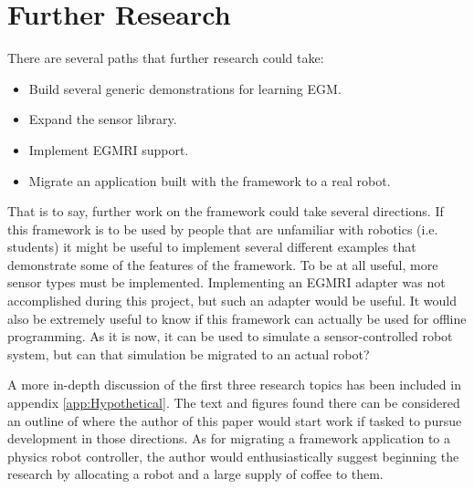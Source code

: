 \documentclass{cslthse-msc}
\begin{document}
\section{Further Research}
\label{sec:Anal_Con:Fur_Res}
There are several paths that further research could take:
\begin{itemize}
    \item Build several generic demonstrations for learning EGM.
    \item Expand the sensor library.
    \item Implement EGMRI support.
    \item Migrate an application built with the framework to a real robot. 
\end{itemize}
That is to say, further work on the framework could take several directions. If this framework is to be used by people that are unfamiliar with robotics (i.e. students) it might be useful to implement several different examples that demonstrate some of the features of the framework. To be at all useful, more sensor types must be implemented. Implementing an EGMRI adapter was not accomplished during this project, but such an adapter would be useful. It would also be extremely useful to know if this framework can actually be used for offline programming. As it is now, it can be used to simulate a sensor-controlled robot system, but can that simulation be migrated to an actual robot?\par

A more in-depth discussion of the first three research topics has been included in appendix \ref{app:Hypothetical}. The text and figures found there can be considered an outline of where the author of this paper would start work if tasked to pursue development in those directions. As for migrating a framework application to a physics robot controller, the author would enthusiastically suggest beginning the research by allocating a robot and a large supply of coffee to them. 
\end{document}
